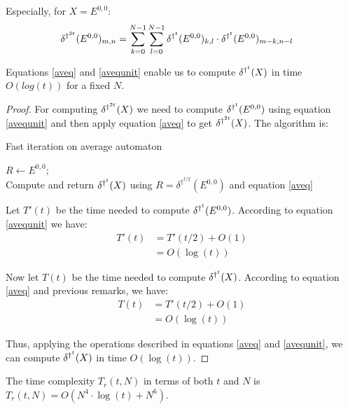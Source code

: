 Especially, for $X = E^{0,0}$:
\begin{equation}
 \label{avequnit}
 \begin{split}
    \delta^{\dag^{2t}} (E^{0,0})_{m,n} & = \sum_{k=0}^{N-1} \sum_{l=0}^{N-1} \delta^{\dag^t} (E^{0,0})_{k,l} \cdot \delta^{\dag^t} (E^{0,0})_{m-k,n-l}
 \end{split}
\end{equation}

\begin{prop}
 Equations \ref{aveq} and \ref{avequnit} enable us to compute $\delta^{\dag^t}(X)$ in time $O(log(t))$ for a fixed $N$.
\end{prop}

\begin{proof}
For computing $\delta^{\dag^{2t}}(X)$ we need to compute $\delta^{\dag^t}(E^{0,0})$ using equation \ref{avequnit} and then apply equation \ref{aveq} to get $\delta^{\dag^{2t}}(X)$. The algorithm is:

\begin{algorithm}[H]
\DontPrintSemicolon
\LinesNotNumbered
{}
\caption{Fast iteration on average automaton\label{algoq5}}
$R \leftarrow E^{0,0}$; \\
Compute and return $\delta^{\dag^t}(X)$ using $R = \delta^{\dag^{t/2}}(E^{0,0})$ and equation \ref{aveq}
\end{algorithm}

 Let $T'(t)$ be the time needed to compute $\delta^{\dag^t}(E^{0,0})$. According to equation \ref{avequnit} we have:
 \[\begin{split}
    T'(t) & = T'(t/2) + O(1) \\
         & = O(\log(t))
   \end{split}
\]
 
 Now let $T(t)$ be the time needed to compute $\delta^{\dag^t}(X)$. According to equation \ref{aveq} and previous remarks, we have:
 \[\begin{split}
    T(t) & = T'(t/2) + O(1) \\
	 & = O(\log(t))
   \end{split}
\]
 
 Thus, applying the operations described in equations \ref{aveq} and \ref{avequnit}, we can compute $\delta^{\dag^t}(X)$ in time $O(\log(t))$. 
\end{proof}

\begin{prop}
 The time complexity $T_r(t,N)$ in terms of both $t$ and $N$ is $T_r(t,N) = O(N^4 \cdot \log(t) + N^6)$.
\end{prop}

